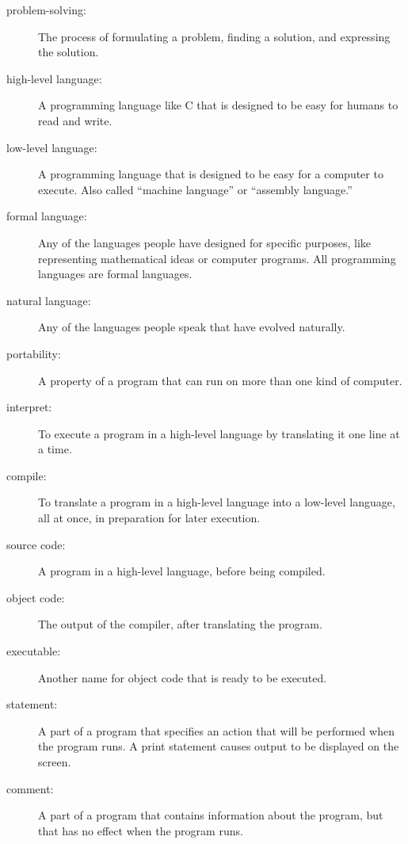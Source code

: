 \begin{description}

\item[problem-solving:]  The process of formulating a problem, finding
a solution, and expressing the solution.

\item[high-level language:]  A programming language like C that
is designed to be easy for humans to read and write.

\item[low-level language:]  A programming language that is designed
to be easy for a computer to execute.  Also called ``machine
language'' or ``assembly language.''

\item[formal language:]  Any of the languages people have designed
for specific purposes, like representing mathematical ideas or
computer programs.  All programming languages are formal languages.

\item[natural language:]  Any of the languages people speak that
have evolved naturally.

\item[portability:]  A property of a program that can run on more
than one kind of computer.

\item[interpret:]  To execute a program in a high-level language
by translating it one line at a time.

\item[compile:]  To translate a program in a high-level language
into a low-level language, all at once, in preparation for later
execution.

\item[source code:]  A program in a high-level language, before
being compiled.

\item[object code:]  The output of the compiler, after translating
the program.

\item[executable:]  Another name for object code that is ready
to be executed.

\item[statement:] A part of a program that specifies an action
that will be performed when the program runs.  A print statement
causes output to be displayed on the screen.

\item[comment:] A part of a program that contains information
about the program, but that has no effect when the program runs.


\end{description}
